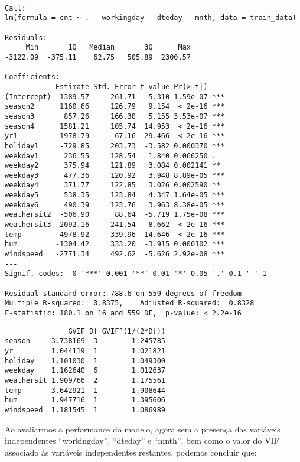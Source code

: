 \documentclass[
  letterpaper,
  DIV=11,
  numbers=noendperiod]{scrartcl}
\begin{document}
\begin{verbatim}

Call:
lm(formula = cnt ~ . - workingday - dteday - mnth, data = train_data)

Residuals:
     Min       1Q   Median       3Q      Max 
-3122.09  -375.11    62.75   505.89  2300.57 

Coefficients:
            Estimate Std. Error t value Pr(>|t|)    
(Intercept)  1389.57     261.71   5.310 1.59e-07 ***
season2      1160.66     126.79   9.154  < 2e-16 ***
season3       857.26     166.30   5.155 3.53e-07 ***
season4      1581.21     105.74  14.953  < 2e-16 ***
yr1          1978.79      67.16  29.466  < 2e-16 ***
holiday1     -729.85     203.73  -3.582 0.000370 ***
weekday1      236.55     128.54   1.840 0.066250 .  
weekday2      375.94     121.89   3.084 0.002141 ** 
weekday3      477.36     120.92   3.948 8.89e-05 ***
weekday4      371.77     122.85   3.026 0.002590 ** 
weekday5      538.35     123.84   4.347 1.64e-05 ***
weekday6      490.39     123.76   3.963 8.38e-05 ***
weathersit2  -506.90      88.64  -5.719 1.75e-08 ***
weathersit3 -2092.16     241.54  -8.662  < 2e-16 ***
temp         4978.92     339.96  14.646  < 2e-16 ***
hum         -1304.42     333.20  -3.915 0.000102 ***
windspeed   -2771.34     492.62  -5.626 2.92e-08 ***
---
Signif. codes:  0 '***' 0.001 '**' 0.01 '*' 0.05 '.' 0.1 ' ' 1

Residual standard error: 788.6 on 559 degrees of freedom
Multiple R-squared:  0.8375,    Adjusted R-squared:  0.8328 
F-statistic: 180.1 on 16 and 559 DF,  p-value: < 2.2e-16
\end{verbatim}

\begin{verbatim}
               GVIF Df GVIF^(1/(2*Df))
season     3.738169  3        1.245785
yr         1.044119  1        1.021821
holiday    1.101030  1        1.049300
weekday    1.162640  6        1.012637
weathersit 1.909766  2        1.175561
temp       3.642921  1        1.908644
hum        1.947716  1        1.395606
windspeed  1.181545  1        1.086989
\end{verbatim}

Ao avaliarmos a performance do modelo, agora sem a presença das
variáveis independentes ``workingday'', ``dteday'' e ``mnth'', bem como
o valor do VIF associado às variáveis independentes restantes, podemos
concluir que:
\end{document}
